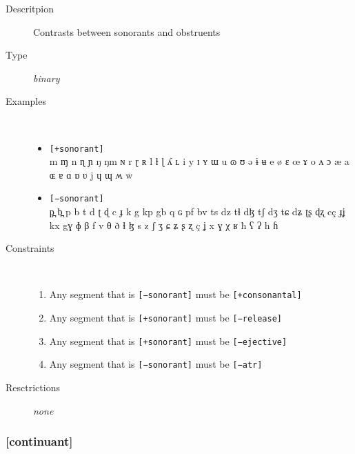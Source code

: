 \documentclass[10pt,letterpaper]{article}
\begin{document}

\begin{description}
\item[Descritpion] Contrasts between sonorants and obstruents
\item[Type] \emph{binary}
\item[Examples]\
  \begin{itemize}
    \item \texttt{[+sonorant]}\\
    m ɱ n ɳ ɲ ŋ ŋm ɴ r ɽ ʀ l ɫ ɭ ʎ ʟ i y ɪ ʏ ɯ u ɷ ʊ ə ɨ ʉ e ø ɛ œ ɤ o ʌ ɔ æ a ɶ ɐ ɑ ɒ ʋ j ɥ ɰ ʍ w 
    \item \texttt{[−sonorant]}\\
     p̪ b̪ p b t d ʈ ɖ c ɟ k g kp gb q ɢ pf bv ts dz tɬ dɮ tʃ dʒ tɕ dʑ ʈʂ ɖʐ cç ɟʝ kx gɣ ɸ β f v θ ð ɬ ɮ s z ʃ ʒ ɕ ʑ ʂ ʐ ç ʝ x ɣ χ ʁ ħ ʕ ʔ h ɦ
  \end{itemize}
\item[Constraints]\
  \begin{enumerate}
    \item Any segment that is \texttt{[−sonorant]} must be \texttt{[+consonantal]}
    \item Any segment that is \texttt{[+sonorant]} must be \texttt{[−release]}
    \item Any segment that is \texttt{[+sonorant]} must be \texttt{[−ejective]}
    \item Any segment that is \texttt{[−sonorant]} must be \texttt{[−atr]}
  \end{enumerate}
\item[Resctrictions] \emph{none}
\end{description}

\subsubsection{[continuant]}
\label{ssub:feature_continuant}
\end{document}
